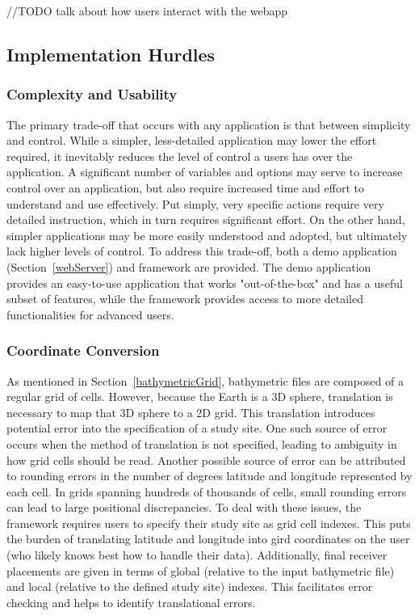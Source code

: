 {{//TODO talk about how users interact with the webapp

\subsection{Implementation Hurdles}
\subsubsection{Complexity and Usability}
The primary trade-off that occurs with any application is that between simplicity and control.  While a simpler, less-detailed application may lower the effort required, it inevitably reduces the level of control a users has over the application.  A significant number of variables and options may serve to increase control over an application, but also require increased time and effort to understand and use effectively.  Put simply, very specific actions require very detailed instruction, which in turn requires significant effort.  On the other hand, simpler applications may be more easily understood and adopted, but ultimately lack higher levels of control.  To address this trade-off, both a demo application (Section~\ref{webServer}) and framework are provided.  The demo application provides an easy-to-use application that works "out-of-the-box" and has a useful subset of features, while the framework provides access to more detailed functionalities for advanced users.

\subsubsection{Coordinate Conversion}
As mentioned in Section~\ref{bathymetricGrid}, bathymetric files are composed of a regular grid of cells.  However, because the Earth is a 3D sphere, translation is necessary to map that 3D sphere to a 2D grid.  This translation introduces potential error into the specification of a study site.  One such source of error occurs when the method of translation is not specified, leading to ambiguity in how grid cells should be read.  Another possible source of error can be attributed to rounding errors in the number of degrees latitude and longitude represented by each cell.  In grids spanning hundreds of thousands of cells, small rounding errors can lead to large positional discrepancies.  To deal with these issues, the framework requires users to specify their study site as grid cell indexes.  This puts the burden of translating latitude and longitude into gird coordinates on the user (who likely knows best how to handle their data).  Additionally, final receiver placements are given in terms of global (relative to the input bathymetric file) and local (relative to the defined study site) indexes.  This facilitates error checking and helps to identify translational errors.  

}}

